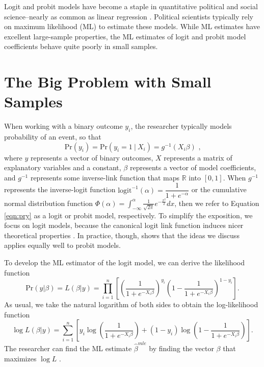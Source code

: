 \documentclass[12pt]{article}
\begin{document}
\thispagestyle{empty}

\newpage
\doublespace

Logit and probit models have become a staple in quantitative political and social science--nearly as common as linear regression \citep{KruegerLewisBeck2008}. 
Political scientists typically rely on maximum likelihood (ML) to estimate these models.
While ML estimates have excellent large-sample properties, the ML estimates of logit and probit model coefficients behave quite poorly in small samples.

\section*{The Big Problem with Small Samples}

When working with a binary outcome $y_i$, the researcher typically models probability of an event, so that
\begin{equation}\label{eqn:pry}
\text{Pr}(y_i) = \text{Pr}(y_i = 1~|~ X_i) =  g^{-1}(X_i\beta)\text{ ,}
\end{equation}
where $y$ represents a vector of binary outcomes, $X$ represents a matrix of explanatory variables and a constant, $\beta$ represents a vector of model coefficients, and $g^{-1}$ represents some inverse-link function that maps $\mathbb{R}$ into $[0, 1]$. 
When $g^{-1}$ represents the inverse-logit function $\text{logit}^{-1}(\alpha) = \dfrac{1}{1 + e^{-\alpha}}$ or the cumulative normal distribution function $\Phi(\alpha) = \int_{-\infty}^\alpha \frac{1}{\sqrt{2\pi}}e^{-\frac{x^2}{2}}dx$, then we refer to Equation \ref{eqn:pry} as a logit or probit model, respectively.
To simplify the exposition, we focus on logit models, because the canonical logit link function induces nicer theoretical properties \citep[pp. 31-32]{McCullaghNelder1989}. 
In practice, though, \cite{KosmidisFirth2009} shows that the ideas we discuss applies equally well to probit models.

To develop the ML estimator of the logit model, we can derive the likelihood function
\begin{equation}\nonumber
\text{Pr}(y | \beta) = L(\beta | y) = \displaystyle \prod_{i = 1}^n \left[\left( \dfrac{1}{1 + e^{-X_i\beta}}\right)^{y_i}\left(1- \dfrac{1}{1 + e^{-X_i\beta}}\right)^{1 - y_i}\right]\text{.}
\end{equation}
\noindent As usual, we take the natural logarithm of both sides to obtain the log-likelihood function
\begin{equation}\nonumber
\log L(\beta | y) = \displaystyle \sum_{i = 1}^n \left[y_i \log \left( \dfrac{1}{1 + e^{-X_i\beta}}\right) + (1 - y_i) \log \left(1- \dfrac{1}{1 + e^{-X_i\beta}}\right)\right].
\end{equation}
\noindent The researcher can find the ML estimate $\hat{\beta}^{mle}$ by finding the vector $\beta$ that maximizes $\log L$ \citep{King1989}.
\end{document}
